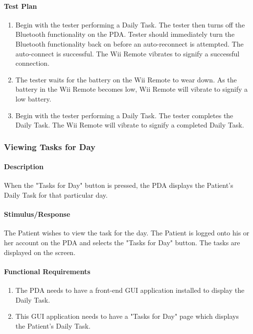 \documentclass{article}
\begin{document}
\paragraph {Test Plan}
\begin{enumerate}
\item Begin with the tester performing a Daily Task. The tester then turns off the Bluetooth functionality on the PDA. Tester should immediately turn the Bluetooth functionality back on before an auto-reconnect is attempted. The auto-connect is successful. The Wii Remote vibrates to signify a successful connection.
\item The tester waits for the battery on the Wii Remote to wear down.  As the battery in the Wii Remote becomes low, Wii Remote will vibrate to signify a low battery. 
\item Begin with the tester performing a Daily Task. The tester completes the Daily Task. The Wii Remote will vibrate to signify a completed Daily Task.
\end{enumerate}

\subsubsection{Viewing Tasks for Day}\label{sec: View Task}

\paragraph{Description}
When the "Tasks for Day" button is pressed, the PDA displays the Patient's Daily Task for that particular day.

\paragraph{Stimulus/Response} 
The Patient wishes to view the task for the day. The Patient is logged onto his or her account on the PDA and selects the "Tasks for Day" button. The tasks are displayed on the screen.

\paragraph{Functional Requirements}
\begin{enumerate}
\item The PDA needs to have a front-end GUI application installed to display the Daily Task. 
\item This GUI application needs to have a "Tasks for Day" page which displays the Patient's Daily Task.
\end{enumerate}
\end{document}
